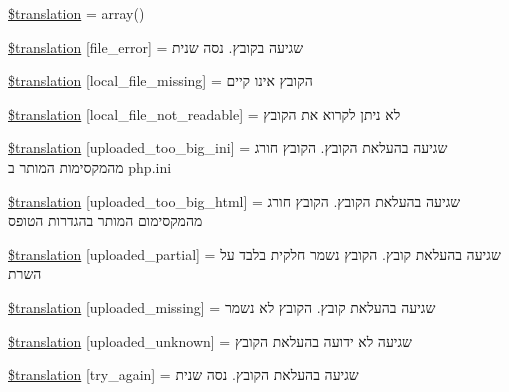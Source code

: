 \begin{DoxyCompactItemize}
\item 
\hyperlink{class_8upload_8he___i_l_8php_a1f198d410fecc3871ebdd468d343a5e3}{\$translation} = array()
\item 
\hyperlink{class_8upload_8he___i_l_8php_ac7498e49b9771b04698029aa61c70821}{\$translation} \mbox{[}\textquotesingle{}file\+\_\+error\textquotesingle{}\mbox{]} = \textquotesingle{}שגיעה בקובץ. נסה שנית\textquotesingle{}
\item 
\hyperlink{class_8upload_8he___i_l_8php_a6ec3d3a47ab70d77e7aa593e82ead10e}{\$translation} \mbox{[}\textquotesingle{}local\+\_\+file\+\_\+missing\textquotesingle{}\mbox{]} = \textquotesingle{}הקובץ אינו קיים\textquotesingle{}
\item 
\hyperlink{class_8upload_8he___i_l_8php_a60104befef9b241f3a7a6a755618a4b3}{\$translation} \mbox{[}\textquotesingle{}local\+\_\+file\+\_\+not\+\_\+readable\textquotesingle{}\mbox{]} = \textquotesingle{}לא ניתן לקרוא את הקובץ\textquotesingle{}
\item 
\hyperlink{class_8upload_8he___i_l_8php_a6a08dcd0d3651fdd098568f6b2f0a42c}{\$translation} \mbox{[}\textquotesingle{}uploaded\+\_\+too\+\_\+big\+\_\+ini\textquotesingle{}\mbox{]} = \textquotesingle{}שגיעה בהעלאת הקובץ. הקובץ חורג מהמקסימות המותר ב php.\+ini\textquotesingle{}
\item 
\hyperlink{class_8upload_8he___i_l_8php_a623d5b8b92169f57d7e43458aa911cbb}{\$translation} \mbox{[}\textquotesingle{}uploaded\+\_\+too\+\_\+big\+\_\+html\textquotesingle{}\mbox{]} = \textquotesingle{}שגיעה בהעלאת הקובץ. הקובץ חורג מהמקסימום המותר בהגדרות הטופס\textquotesingle{}
\item 
\hyperlink{class_8upload_8he___i_l_8php_a967c17da21b0a2d3bd65cca3a9ca0ea8}{\$translation} \mbox{[}\textquotesingle{}uploaded\+\_\+partial\textquotesingle{}\mbox{]} = \textquotesingle{}שגיעה בהעלאת קובץ. הקובץ נשמר חלקית בלבד על השרת\textquotesingle{}
\item 
\hyperlink{class_8upload_8he___i_l_8php_a0cce433260be65f1f35853a6b4b8952b}{\$translation} \mbox{[}\textquotesingle{}uploaded\+\_\+missing\textquotesingle{}\mbox{]} = \textquotesingle{}שגיעה בהעלאת קובץ. הקובץ לא נשמר\textquotesingle{}
\item 
\hyperlink{class_8upload_8he___i_l_8php_a4a9168e922b827e6a28b5db1c00774ca}{\$translation} \mbox{[}\textquotesingle{}uploaded\+\_\+unknown\textquotesingle{}\mbox{]} = \textquotesingle{}שגיעה לא ידועה בהעלאת הקובץ\textquotesingle{}
\item 
\hyperlink{class_8upload_8he___i_l_8php_a3afc377bd803683314f413a814243066}{\$translation} \mbox{[}\textquotesingle{}try\+\_\+again\textquotesingle{}\mbox{]} = \textquotesingle{}שגיעה בהעלאת הקובץ. נסה שנית\textquotesingle{}

\end{DoxyCompactItemize}
